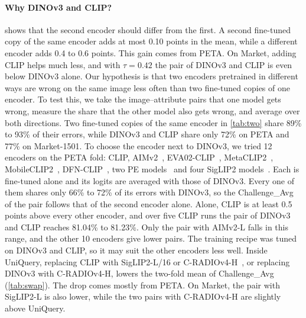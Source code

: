 \documentclass[10pt,twocolumn,letterpaper]{article}
\begin{document}
\paragraph{Why DINOv3 and CLIP?}  shows that the second encoder should differ from the first. A second fine-tuned copy of the same encoder adds at most 0.10 points in the mean, while a different encoder adds 0.4 to 0.6 points. This gain comes from PETA. On Market, adding CLIP helps much less, and with $\tau=0.42$ the pair of DINOv3 and CLIP is even below DINOv3 alone. Our hypothesis is that two encoders pretrained in different ways are wrong on the same image less often than two fine-tuned copies of one encoder. To test this, we take the image--attribute pairs that one model gets wrong, measure the share that the other model also gets wrong, and average over both directions. Two fine-tuned copies of the same encoder in \cref{tab:two} share 89\% to 93\% of their errors, while DINOv3 and CLIP share only 72\% on PETA and 77\% on Market-1501. To choose the encoder next to DINOv3, we tried 12 encoders on the PETA fold: CLIP, AIMv2~\cite{aimv2}, EVA02-CLIP~\cite{evaclip}, MetaCLIP2~\cite{metaclip2}, MobileCLIP2~\cite{mobileclip2}, DFN-CLIP~\cite{dfn}, two PE models~\cite{pe} and four SigLIP2 models~\cite{siglip2}. Each is fine-tuned alone and its logits are averaged with those of DINOv3. Every one of them shares only 66\% to 72\% of its errors with DINOv3, so the Challenge\_Avg of the pair follows that of the second encoder alone. Alone, CLIP is at least 0.5 points above every other encoder, and over five CLIP runs the pair of DINOv3 and CLIP reaches 81.04\% to 81.23\%. Only the pair with AIMv2-L falls in this range, and the other 10 encoders give lower pairs. The training recipe was tuned on DINOv3 and CLIP, so it may suit the other encoders less well. Inside UniQuery, replacing CLIP with SigLIP2-L/16 or C-RADIOv4-H~\cite{cradio4}, or replacing DINOv3 with C-RADIOv4-H, lowers the two-fold mean of Challenge\_Avg (\cref{tab:swap}). The drop comes mostly from PETA. On Market, the pair with SigLIP2-L is also lower, while the two pairs with C-RADIOv4-H are slightly above UniQuery.
\end{document}
